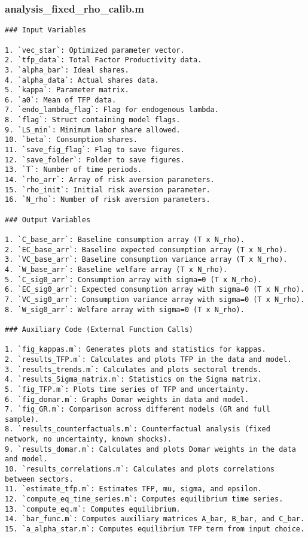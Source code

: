 \documentclass[11pt]{article}
\theoremstyle{definition}
\newcommand{\codepath}{F:/12004835/replication_package_final/replication_package_final}
\begin{document}
	\subsubsection{analysis\_fixed\_rho\_calib.m}
	\begin{lstlisting}[style=Matlab]
### Input Variables

1. `vec_star`: Optimized parameter vector.
2. `tfp_data`: Total Factor Productivity data.
3. `alpha_bar`: Ideal shares.
4. `alpha_data`: Actual shares data.
5. `kappa`: Parameter matrix.
6. `a0`: Mean of TFP data.
7. `endo_lambda_flag`: Flag for endogenous lambda.
8. `flag`: Struct containing model flags.
9. `LS_min`: Minimum labor share allowed.
10. `beta`: Consumption shares.
11. `save_fig_flag`: Flag to save figures.
12. `save_folder`: Folder to save figures.
13. `T`: Number of time periods.
14. `rho_arr`: Array of risk aversion parameters.
15. `rho_init`: Initial risk aversion parameter.
16. `N_rho`: Number of risk aversion parameters.

### Output Variables

1. `C_base_arr`: Baseline consumption array (T x N_rho).
2. `EC_base_arr`: Baseline expected consumption array (T x N_rho).
3. `VC_base_arr`: Baseline consumption variance array (T x N_rho).
4. `W_base_arr`: Baseline welfare array (T x N_rho).
5. `C_sig0_arr`: Consumption array with sigma=0 (T x N_rho).
6. `EC_sig0_arr`: Expected consumption array with sigma=0 (T x N_rho).
7. `VC_sig0_arr`: Consumption variance array with sigma=0 (T x N_rho).
8. `W_sig0_arr`: Welfare array with sigma=0 (T x N_rho).

### Auxiliary Code (External Function Calls)

1. `fig_kappas.m`: Generates plots and statistics for kappas.
2. `results_TFP.m`: Calculates and plots TFP in the data and model.
3. `results_trends.m`: Calculates and plots sectoral trends.
4. `results_Sigma_matrix.m`: Statistics on the Sigma matrix.
5. `fig_TFP.m`: Plots time series of TFP and uncertainty.
6. `fig_domar.m`: Graphs Domar weights in data and model.
7. `fig_GR.m`: Comparison across different models (GR and full sample).
8. `results_counterfactuals.m`: Counterfactual analysis (fixed network, no uncertainty, known shocks).
9. `results_domar.m`: Calculates and plots Domar weights in the data and model.
10. `results_correlations.m`: Calculates and plots correlations between sectors.
11. `estimate_tfp.m`: Estimates TFP, mu, sigma, and epsilon.
12. `compute_eq_time_series.m`: Computes equilibrium time series.
13. `compute_eq.m`: Computes equilibrium.
14. `bar_func.m`: Computes auxiliary matrices A_bar, B_bar, and C_bar.
15. `a_alpha_star.m`: Computes equilibrium TFP term from input choice.
	\end{lstlisting}
	
	
\end{document}

